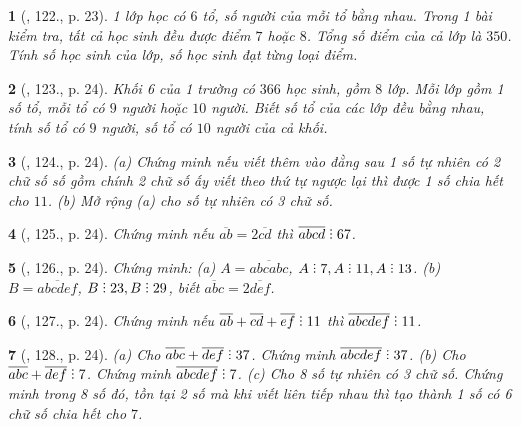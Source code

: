\documentclass{article}
\newtheorem{baitoan}{}
\DeclareRobustCommand{\divby}{%
	\mathrel{\vbox{\baselineskip.65ex\lineskiplimit0pt\hbox{.}\hbox{.}\hbox{.}}}%
}
\begin{document}
\begin{baitoan}[\cite{Binh_Toan_6_tap_1}, 122., p. 23]
	1 lớp học có $6$ tổ, số người của mỗi tổ bằng nhau. Trong 1 bài kiểm tra, tất cả học sinh đều được điểm $7$ hoặc $8$. Tổng số điểm của cả lớp là $350$. Tính số học sinh của lớp, số học sinh đạt từng loại điểm.
\end{baitoan}

\begin{baitoan}[\cite{Binh_Toan_6_tap_1}, 123., p. 24]
	Khối 6 của 1 trường có $366$ học sinh, gồm $8$ lớp. Mỗi lớp gồm 1 số tổ, mỗi tổ có $9$ người hoặc $10$ người. Biết số tổ của các lớp đều bằng nhau, tính số tổ có $9$ người, số tổ có $10$ người của cả khối.
\end{baitoan}

\begin{baitoan}[\cite{Binh_Toan_6_tap_1}, 124., p. 24]
	(a) Chứng minh nếu viết thêm vào đằng sau 1 số tự nhiên có 2 chữ số số gồm chính 2 chữ số ấy viết theo thứ tự ngược lại thì được 1 số chia hết cho $11$. (b) Mở rộng (a) cho số tự nhiên có 3 chữ số.
\end{baitoan}

\begin{baitoan}[\cite{Binh_Toan_6_tap_1}, 125., p. 24]
	Chứng minh nếu $\overline{ab} = 2\overline{cd}$ thì $\overline{abcd}\divby67$.
\end{baitoan}

\begin{baitoan}[\cite{Binh_Toan_6_tap_1}, 126., p. 24]
	Chứng minh: (a) $A = \overline{abcabc}$, $A\divby7,A\divby11,A\divby13$. (b) $B = \overline{abcdef}$, $B\divby23,B\divby29$, biết $\overline{abc} = 2\overline{def}$.
\end{baitoan}

\begin{baitoan}[\cite{Binh_Toan_6_tap_1}, 127., p. 24]
	Chứng minh nếu $\overline{ab} + \overline{cd} + \overline{ef}\divby11$ thì $\overline{abcdef}\divby11$.
\end{baitoan}

\begin{baitoan}[\cite{Binh_Toan_6_tap_1}, 128., p. 24]
	(a) Cho $\overline{abc} + \overline{def}\divby37$. Chứng minh $\overline{abcdef}\divby37$. (b) Cho $\overline{abc} + \overline{def}\divby7$. Chứng minh $\overline{abcdef}\divby7$. (c) Cho 8 số tự nhiên có 3 chữ số. Chứng minh trong 8 số đó, tồn tại 2 số mà khi viết liên tiếp nhau thì tạo thành 1 số có 6 chữ số chia hết cho $7$.
\end{baitoan}
\end{document}
